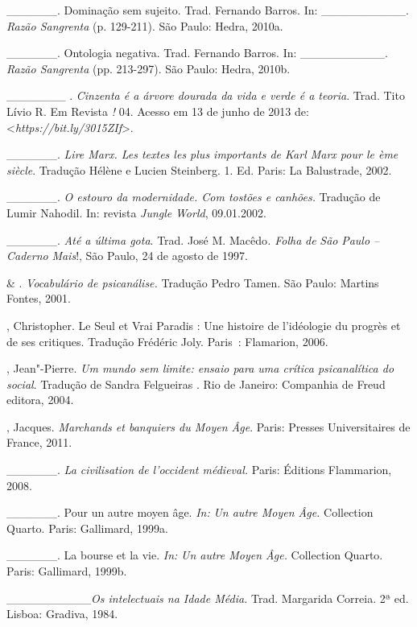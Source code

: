 \begin{Parskip}
\_\_\_\_\_\_. Dominação sem sujeito. Trad. Fernando Barros. In:
\_\_\_\_\_\_\_\_\_\_. \emph{Razão Sangrenta} (p. 129-211). São Paulo:
Hedra, 2010a.

\_\_\_\_\_\_. Ontologia negativa. Trad. Fernando Barros. In:
\_\_\_\_\_\_\_\_\_\_. \emph{Razão Sangrenta} (pp. 213-297). São Paulo:
Hedra, 2010b.

\_\_\_\_\_\_\_ . \emph{Cinzenta é a árvore dourada da vida e verde é a
teoria}. Trad. Tito Lívio R. Em Revista \emph{!} 04. Acesso em 13 de
junho de 2013 de: \textless{}\emph{https://bit.ly/3015ZIf}\textgreater{}.

\_\_\_\_\_\_. \emph{Lire Marx. Les textes les plus importants de Karl
Marx pour le ème siècle}. Tradução Hélène e Lucien Steinberg.
1. Ed. Paris: La Balustrade, 2002.

\_\_\_\_\_\_. \emph{O estouro da modernidade. Com tostões e canhões.}
Tradução de Lumir Nahodil. In: revista \emph{Jungle} \emph{World},
09.01.2002.

\_\_\_\_\_\_. \emph{Até a última gota}. Trad. José M. Macêdo\emph{.
Folha} \emph{de} \emph{São} \emph{Paulo -- Caderno} \emph{Mais}!, São
Paulo, 24 de agosto de 1997.

 \& . \emph{Vocabulário de psicanálise.} Tradução
Pedro Tamen. São Paulo: Martins Fontes, 2001.

, Christopher. Le Seul et Vrai Paradis : Une histoire de
l'idéologie du progrès et de ses critiques. Tradução Frédéric Joly.
Paris~: Flamarion, 2006.

, Jean"-Pierre. \emph{Um mundo sem limite: ensaio para uma
crítica psicanalítica do social}. Tradução de Sandra Felgueiras .
Rio de Janeiro: Companhia de Freud editora, 2004.

, Jacques. \emph{Marchands et banquiers du Moyen Âge}. Paris:
Presses Universitaires de France, 2011.

\_\_\_\_\_\_. \emph{La civilisation de l'occident médieval.} Paris:
Éditions Flammarion, 2008.

\_\_\_\_\_\_. Pour un autre moyen âge. \emph{In:} \emph{Un autre Moyen
Âge.} Collection Quarto. Paris: Gallimard, 1999a.

\_\_\_\_\_\_. La bourse et la vie. \emph{In:} \emph{Un autre Moyen
Âge.} Collection Quarto. Paris: Gallimard, 1999b.

\_\_\_\_\_\_\_\_\_\_\emph{Os intelectuais na Idade Média.} Trad.
Margarida Correia. 2ª ed. Lisboa: Gradiva, 1984.


\end{Parskip}
